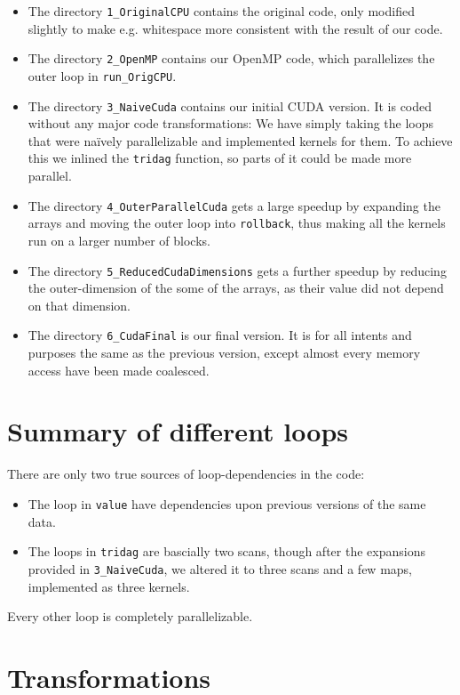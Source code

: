 \documentclass[]{report}
\begin{document}
\begin{itemize}
\item The directory \texttt{1\_OriginalCPU} contains the original code, only
  modified slightly to make e.g. whitespace more consistent with the
  result of our code.
\item The directory \texttt{2\_OpenMP} contains our OpenMP code, which
  parallelizes the outer loop in \texttt{run\_OrigCPU}.
\item The directory \texttt{3\_NaiveCuda} contains our initial CUDA
  version. It is coded without any major code transformations: We have
  simply taking the loops that were naïvely parallelizable and
  implemented kernels for them. To achieve this we inlined the
  \texttt{tridag} function, so parts of it could be made more parallel.
\item The directory \texttt{4\_OuterParallelCuda} gets a large speedup by expanding
  the arrays and moving the outer loop into \texttt{rollback}, thus
  making all the kernels run on a larger number of blocks.
\item The directory \texttt{5\_ReducedCudaDimensions} gets a further speedup by reducing
  the outer-dimension of the some of the arrays, as their value did not
  depend on that dimension.
\item The directory \texttt{6\_CudaFinal} is our final version. It is for
  all intents and purposes the same as the previous version, except
  almost every memory access have been made coalesced.
\end{itemize}

\chapter{Summary of different loops}
There are only two true sources of loop-dependencies in the code:

\begin{itemize}
  \item The loop in \texttt{value} have dependencies upon previous
    versions of the same data.
  \item The loops in \texttt{tridag} are bascially two scans, though
    after the expansions provided in \texttt{3\_NaiveCuda}, we altered it
    to three scans and a few maps, implemented as three kernels.
\end{itemize}

Every other loop is completely parallelizable.

\chapter{Transformations}





\end{document}
